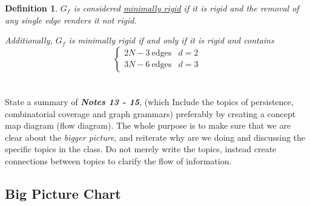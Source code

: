 \documentclass[]{article}
\numberwithin{equation}{section}
\newtheorem{definition}{Definition}
\begin{document}
\begin{definition} \label{def:graph_rigid_min}
    $G_f$ is considered \emph{\underline{minimally rigid}} if it is rigid and the removal of any single edge renders it not rigid.

    Additionally, $G_f$ is minimally rigid if and only if it is rigid and contains \[
        \begin{cases}
            2N - 3 \ \text{edges} & d=2\\
            3N - 6 \ \text{edges} & d=3
        \end{cases}
    \]
\end{definition}

\newpage
\section{}
State a summary of \emph{\textbf{Notes 13 - 15}}, (which Include the topics of persistence, combinatorial coverage and graph grammars) preferably by creating a concept map diagram (flow diagram). 
The whole purpose is to make sure that we are clear about the \emph{bigger picture}, and reiterate why are we doing and discussing the specific topics in the class. 
Do not merely write the topics, instead create connections between topics to clarify the flow of information.

\subsection{Big Picture Chart}
		
\end{document}
